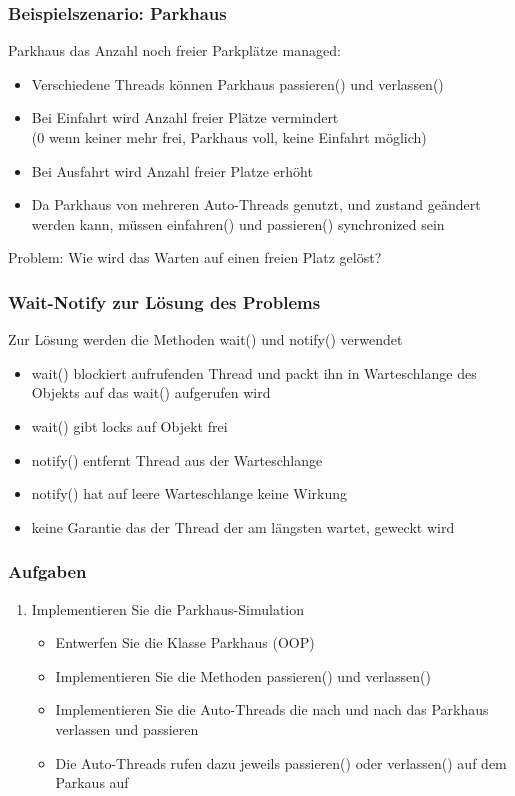 \begin{frame}[fragile]
	\frametitle{Beispielszenario: Parkhaus}
	\begin{block}{Parkhaus das Anzahl noch freier Parkplätze managed:}
	\begin{itemize}
	  \item Verschiedene Threads können Parkhaus passieren() und verlassen()
	  \item Bei Einfahrt wird Anzahl freier Plätze vermindert \\
	  (0 wenn keiner mehr frei, Parkhaus voll, keine Einfahrt möglich)
	  \item Bei Ausfahrt wird Anzahl freier Platze erhöht
	  \item Da Parkhaus von mehreren Auto-Threads genutzt, und zustand geändert
	  werden kann, müssen einfahren() und passieren() synchronized sein
	\end{itemize}
	\end{block}
	\begin{alertblock}{Problem:}
	Wie wird das Warten auf einen freien Platz gelöst?
	\end{alertblock}
\end{frame}

\begin{frame}[fragile]
	\frametitle{Wait-Notify zur Lösung des Problems}
	Zur Lösung werden die Methoden wait() und notify() verwendet
	\begin{itemize}
	  \item wait() blockiert aufrufenden Thread und packt ihn in Warteschlange des
	  Objekts auf das wait() aufgerufen wird
	  \item wait() gibt locks auf Objekt frei
	  \item notify() entfernt Thread aus der Warteschlange 
	  \item notify() hat auf leere Warteschlange keine Wirkung
	  \item keine Garantie das der Thread der am längsten wartet, geweckt wird
	\end{itemize}
\end{frame}

\begin{frame}
	\frametitle{Aufgaben}
	\begin{enumerate}
	  \item Implementieren Sie die Parkhaus-Simulation
	  \begin{itemize}
	    \item Entwerfen Sie die Klasse Parkhaus (OOP)
	    \item Implementieren Sie die Methoden passieren() und verlassen()
	    \item Implementieren Sie die Auto-Threads die nach und nach das Parkhaus
	    verlassen und passieren
	    \item Die Auto-Threads rufen dazu jeweils passieren() oder verlassen() auf
	    dem Parkaus auf
	  \end{itemize}
	\end{enumerate}
\end{frame}


